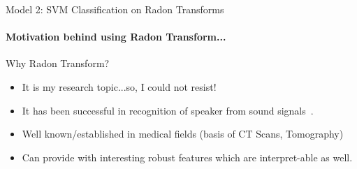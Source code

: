 \documentclass{beamer}
\begin{document}
\begin{frame}{Model 2: SVM Classification on Radon Transforms}
  \framesubtitle{Motivation behind using Radon Transform...}

  \begin{block}{Why Radon Transform?}
    \begin{itemize}
  \item It is my research topic...so, I could not resist!
  \item It has been successful in recognition of speaker from sound
    signals~\cite{ajmera_text-independent_2011-2}.

  \item Well known/established in medical fields (basis of CT Scans, Tomography)

  \item Can provide with interesting robust features which are interpret-able as well.
    \end{itemize}
  \end{block}

\end{frame}
\end{document}
